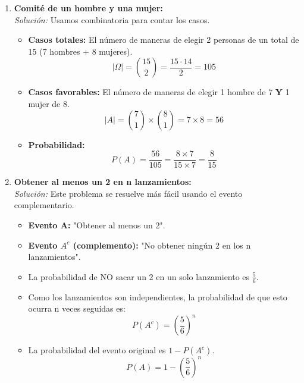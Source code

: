 \documentclass[12pt, letterpaper]{article}
\begin{document}
\begin{enumerate}
	\item \textbf{Comité de un hombre y una mujer:} \\
	      \textit{Solución:} Usamos combinatoria para contar los casos.
	      \begin{itemize}
		      \item \textbf{Casos totales:} El número de maneras de elegir 2 personas de un total de 15 (7 hombres + 8 mujeres).
		            \[ |\Omega| = \binom{15}{2} = \frac{15 \cdot 14}{2} = 105 \]
		      \item \textbf{Casos favorables:} El número de maneras de elegir 1 hombre de 7 \textbf{Y} 1 mujer de 8.
		            \[ |A| = \binom{7}{1} \times \binom{8}{1} = 7 \times 8 = 56 \]
		      \item \textbf{Probabilidad:}
		            \[ P(A) = \frac{56}{105} = \frac{8 \times 7}{15 \times 7} = \frac{8}{15} \]
	      \end{itemize}

	\item \textbf{Obtener al menos un 2 en n lanzamientos:} \\
	      \textit{Solución:} Este problema se resuelve más fácil usando el evento complementario.
	      \begin{itemize}
		      \item \textbf{Evento A:} "Obtener al menos un 2".
		      \item \textbf{Evento $A^c$ (complemento):} "No obtener ningún 2 en los n lanzamientos".
		      \item La probabilidad de NO sacar un 2 en un solo lanzamiento es $\frac{5}{6}$.
		      \item Como los lanzamientos son independientes, la probabilidad de que esto ocurra n veces seguidas es:
		            \[ P(A^c) = \left(\frac{5}{6}\right)^n \]
		      \item La probabilidad del evento original es $1 - P(A^c)$.
		            \[ P(A) = 1 - \left(\frac{5}{6}\right)^n \]
	      \end{itemize}


\end{enumerate}
\end{document}
